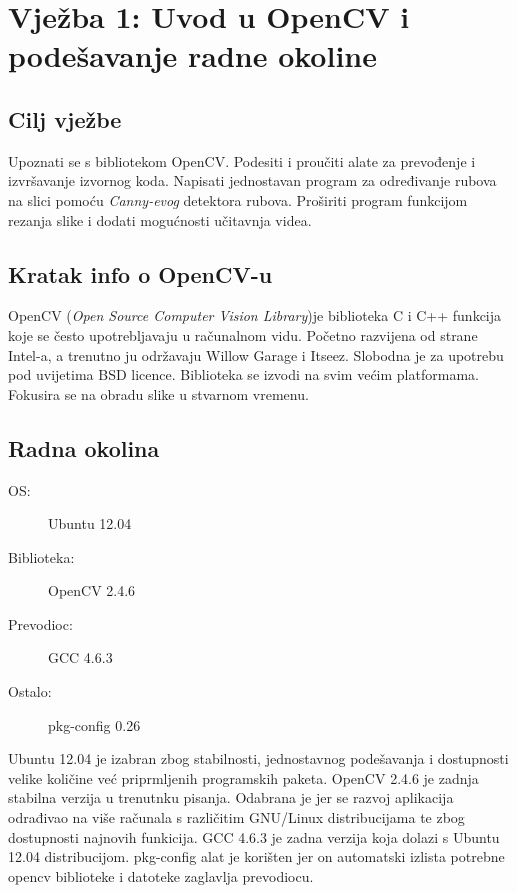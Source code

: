 \setcounter{figure}{0}
\section{Vježba 1: Uvod u OpenCV i podešavanje radne okoline}

\subsection{Cilj vježbe}
Upoznati se s bibliotekom OpenCV. Podesiti i proučiti alate za
prevođenje i izvršavanje izvornog koda. Napisati jednostavan program za
određivanje rubova na slici pomoću \emph{Canny-evog} detektora rubova.
Proširiti program funkcijom rezanja slike i dodati mogućnosti učitavnja
videa.\\

\subsection{Kratak info o OpenCV-u}

OpenCV (\emph{Open Source Computer Vision Library})je biblioteka C i C++
funkcija koje se često upotrebljavaju u računalnom vidu. Početno
razvijena od strane Intel-a, a trenutno ju održavaju Willow Garage i
Itseez.  Slobodna je za upotrebu pod uvijetima BSD licence. Biblioteka
se izvodi na svim većim platformama. Fokusira se na obradu slike u
stvarnom vremenu.

\subsection{Radna okolina}

\begin{description}
  \item[OS:] Ubuntu 12.04
  \item[Biblioteka:] OpenCV 2.4.6
  \item[Prevodioc:] GCC 4.6.3 
  \item[Ostalo:] pkg-config 0.26
\end{description}

Ubuntu 12.04 je izabran zbog stabilnosti, jednostavnog podešavanja i 
dostupnosti velike količine već priprmljenih programskih paketa.
OpenCV 2.4.6 je zadnja stabilna verzija u trenutnku pisanja. Odabrana
je jer se razvoj aplikacija odrađivao na više računala s različitim 
GNU/Linux distribucijama te zbog dostupnosti najnovih funkicija.
GCC 4.6.3 je zadna verzija koja dolazi s Ubuntu 12.04 distribucijom.
pkg-config alat je korišten jer on automatski izlista potrebne
opencv biblioteke i datoteke zaglavlja prevodiocu. 
\\


